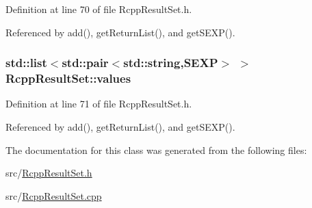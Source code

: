 Definition at line 70 of file RcppResultSet.h.

Referenced by add(), getReturnList(), and getSEXP().\hypertarget{classRcppResultSet_a509f3d779c88476dea89ade9c08d403f}{
\subsubsection[{values}]{\setlength{\rightskip}{0pt plus 5cm}std::list$<$std::pair$<$std::string,SEXP$>$ $>$ {\bf RcppResultSet::values}}}
\label{classRcppResultSet_a509f3d779c88476dea89ade9c08d403f}


Definition at line 71 of file RcppResultSet.h.

Referenced by add(), getReturnList(), and getSEXP().

The documentation for this class was generated from the following files:\begin{DoxyCompactItemize}
\item 
src/\hyperlink{RcppResultSet_8h}{RcppResultSet.h}\item 
src/\hyperlink{RcppResultSet_8cpp}{RcppResultSet.cpp}\end{DoxyCompactItemize}
